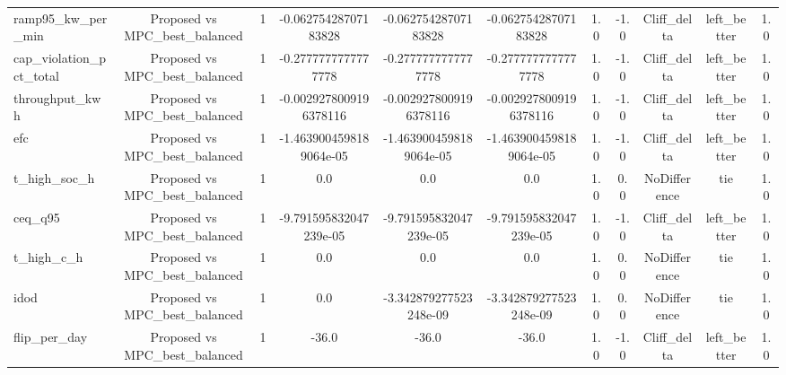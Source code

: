 \begin{table}[t]
\begin{tabular}{lcccccccccc}
ramp95\_kw\_per\_min & Proposed vs MPC\_best\_balanced & 1 & -0.06275428707183828 & -0.06275428707183828 & -0.06275428707183828 & 1.0 & -1.0 & Cliff\_delta & left\_better & 1.0 \\
cap\_violation\_pct\_total & Proposed vs MPC\_best\_balanced & 1 & -0.2777777777777778 & -0.2777777777777778 & -0.2777777777777778 & 1.0 & -1.0 & Cliff\_delta & left\_better & 1.0 \\
throughput\_kwh & Proposed vs MPC\_best\_balanced & 1 & -0.0029278009196378116 & -0.0029278009196378116 & -0.0029278009196378116 & 1.0 & -1.0 & Cliff\_delta & left\_better & 1.0 \\
efc & Proposed vs MPC\_best\_balanced & 1 & -1.4639004598189064e-05 & -1.4639004598189064e-05 & -1.4639004598189064e-05 & 1.0 & -1.0 & Cliff\_delta & left\_better & 1.0 \\
t\_high\_soc\_h & Proposed vs MPC\_best\_balanced & 1 & 0.0 & 0.0 & 0.0 & 1.0 & 0.0 & NoDifference & tie & 1.0 \\
ceq\_q95 & Proposed vs MPC\_best\_balanced & 1 & -9.791595832047239e-05 & -9.791595832047239e-05 & -9.791595832047239e-05 & 1.0 & -1.0 & Cliff\_delta & left\_better & 1.0 \\
t\_high\_c\_h & Proposed vs MPC\_best\_balanced & 1 & 0.0 & 0.0 & 0.0 & 1.0 & 0.0 & NoDifference & tie & 1.0 \\
idod & Proposed vs MPC\_best\_balanced & 1 & 0.0 & -3.342879277523248e-09 & -3.342879277523248e-09 & 1.0 & 0.0 & NoDifference & tie & 1.0 \\
flip\_per\_day & Proposed vs MPC\_best\_balanced & 1 & -36.0 & -36.0 & -36.0 & 1.0 & -1.0 & Cliff\_delta & left\_better & 1.0 \\
\bottomrule
\end{tabular}
\end{table}